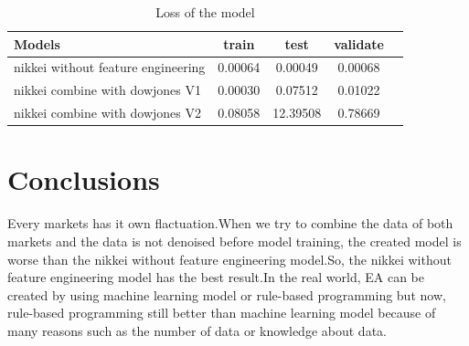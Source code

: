 \documentclass{article}
\begin{document}
\begin{table}
\centering
\begin{tabular}{|l|c|c|c|c|} %
 \hline %
Models & train & test & validate \\ %
 \hline
 nikkei without feature engineering & 0.00064 & 0.00049 & 0.00068 \\
 nikkei combine with dowjones V1 & 0.00030 & 0.07512 & 0.01022 \\
 nikkei combine with dowjones V2 & 0.08058 & 12.39508 & 0.78669 \\
\hline
\end{tabular}
\caption{Loss of the model}
\label{tab:table}
\end{table}


\section{Conclusions}
\label{sec:conclusion}
Every markets has it own flactuation.When we try to combine the data of both markets and the data is not denoised before model training, the created model is worse than the nikkei without feature engineering model.So, the nikkei without feature engineering model has the best result.In the real world, EA can be created by using machine learning model or rule-based programming but now, rule-based programming still better than machine learning model because of many reasons such as the number of data or knowledge about data.





\end{document}
